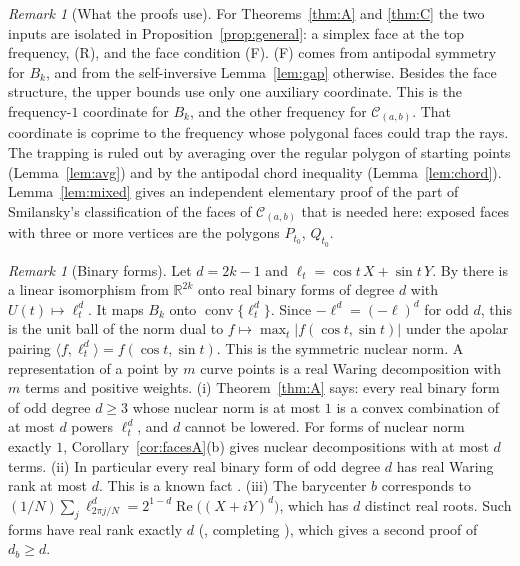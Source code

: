 \documentclass[11pt]{amsart}
\theoremstyle{remark}
\newtheorem{remark}[theorem]{Remark}
\newcommand{\R}{\mathbb{R}}
\newcommand{\conv}{\operatorname{conv}}
\newcommand{\re}{\operatorname{Re}}
\begin{document}
\begin{remark}[What the proofs use]
For Theorems~\ref{thm:A} and \ref{thm:C} the two inputs are isolated in Proposition~\ref{prop:general}: a simplex face at the top frequency, (R), and the face condition (F).
(F) comes from antipodal symmetry for $B_k$, and from the self-inversive Lemma~\ref{lem:gap} otherwise. Besides the face structure, the upper bounds use only one auxiliary coordinate. This is the frequency-$1$ coordinate for $B_k$, and the other frequency for $\mathcal C_{(a,b)}$.
That coordinate is coprime to the frequency whose polygonal faces could trap the rays. The trapping is ruled out by averaging over the regular polygon of starting
points (Lemma~\ref{lem:avg}) and by the antipodal chord inequality (Lemma~\ref{lem:chord}). Lemma~\ref{lem:mixed} gives an independent elementary proof of the part of
Smilansky's classification of the faces of $\mathcal C_{(a,b)}$ \cite{Smi} that is needed here: exposed faces with three or more vertices are the polygons
$P_{t_0}$, $Q_{t_0}$.
\end{remark}

\begin{remark}[Binary forms]\label{rem:forms}
Let $d=2k-1$ and $\ell_t=\cos t\,X+\sin t\,Y$. By \cite[\S5]{SSS} there is a linear isomorphism from $\R^{2k}$ onto real binary forms of degree $d$ with $U(t)\mapsto\ell_t^d$.
It maps $B_k$ onto $\conv\{\ell_t^d\}$. Since $-\ell^d=(-\ell)^d$ for odd $d$, this is the unit ball of the norm dual to $f\mapsto\max_t|f(\cos t,\sin t)|$ under the apolar
pairing $\langle f,\ell_t^d\rangle=f(\cos t,\sin t)$. This is the symmetric nuclear norm. A representation of a point by $m$ curve points is a real Waring decomposition
with $m$ terms and positive weights.
(i) Theorem~\ref{thm:A} says: every real binary form of odd degree $d\ge3$ whose nuclear norm is at most $1$ is a convex combination of at most $d$ powers $\ell_t^d$, and $d$
cannot be lowered. For forms of nuclear norm exactly $1$, Corollary~\ref{cor:facesA}(b) gives nuclear decompositions with at most $d$ terms.
(ii) In particular every real binary form of odd degree $d$ has real Waring rank at most $d$. This is a known fact \cite[Prop.~2.1]{CO}.
(iii) The barycenter $b$ corresponds to $(1/N)\sum_j\ell_{2\pi j/N}^d=2^{1-d}\re\big((X+iY)^d\big)$, which has $d$ distinct real roots. Such forms have real rank exactly $d$
(\cite[Cor.~1]{CR}, completing \cite{CO}), which gives a second proof of $d_b\ge d$.
\end{remark}
\end{document}
